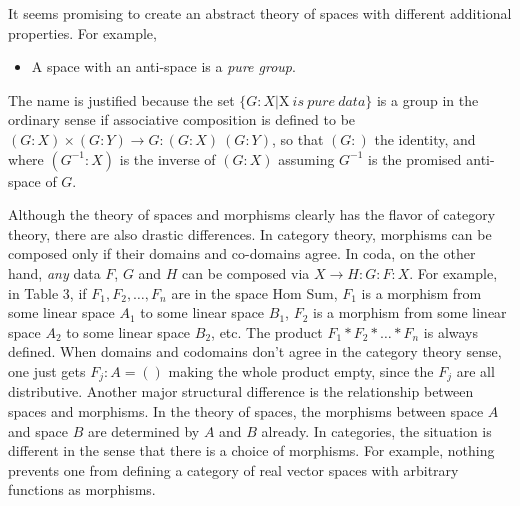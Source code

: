 \documentclass[11pt]{article}
\begin{document}
     It seems promising to create an abstract theory of spaces with different additional properties.  For 
 example, 
\begin{itemize}
\item A space with an anti-space is a {\it pure group}.
\end{itemize}
The name is justified because the set $\{G:X | $X$\ is\ pure\ data\}$ 
is a group in the ordinary sense if associative composition is defined to be $(G:X)\times(G:Y)\rightarrow G:(G:X)\ (G:Y)$, so that   
$(G:)$ the identity, and where $(G^{-1}:X)$ is the inverse of $(G:X)$ assuming $G^{-1}$ is the promised anti-space of $G$.  

    Although the theory of spaces and morphisms clearly has the flavor of category theory, there are 
also drastic differences.  In category theory, morphisms can be composed only if their domains and co-domains 
agree.  In coda, on the other hand, {\it any} data $F$, $G$ and $H$ can be composed via 
$X\rightarrow H:G:F:X$.  For example, in Table 3, if $F_1,F_2,\dots,F_n$ are in the space 
Hom Sum, $F_1$ is a morphism from some linear space $A_1$ to some linear space $B_1$, $F_2$ is a 
morphism from some linear space $A_2$ to some linear space $B_2$, etc.  The product $F_1*F_2*\dots *F_n$ 
is always defined.  When domains and codomains don't agree in the category theory sense, one just gets 
$F_j:A=()$ making the whole product empty, since the $F_j$ are all distributive.  Another major structural difference 
is the relationship between spaces and morphisms.  In the theory of spaces, the morphisms between space 
$A$ and space $B$ are determined by $A$ and $B$ already.  In categories, the situation is different in the 
sense that there is a choice of morphisms.  For example, nothing prevents one from defining a category 
of real vector spaces with arbitrary functions as morphisms.  
\end{document}
